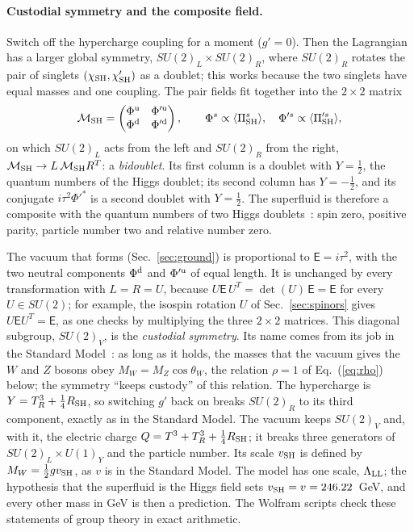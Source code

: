 \documentclass[aps,prd,twocolumn,superscriptaddress,nofootinbib,floatfix,longbibliography]{revtex4-2}
\newcommand{\LL}{{\rm LL}}
\newcommand{\SH}{{\rm SH}}
\begin{document}
\paragraph*{Custodial symmetry and the composite field.}
Switch off the hypercharge coupling for a moment ($g'=0$). Then the Lagrangian has a larger global symmetry,
$SU(2)_L\times SU(2)_R$, where $SU(2)_R$ rotates the pair of singlets $(\chi_\SH,\chi'_\SH)$ as a doublet; this works
because the two singlets have equal masses and one coupling. The pair fields fit together into the $2\times2$ matrix
\begin{equation}
\mathcal M_\SH=\begin{pmatrix}\Phi^{\rm u}&\Phi'^{\rm u}\\\Phi^{\rm d}&\Phi'^{\rm d}\end{pmatrix},\qquad
\Phi^s\propto\langle\Pi^s_\SH\rangle,\quad\Phi'^s\propto\langle\Pi'^s_\SH\rangle ,
\label{eq:M}
\end{equation}
on which $SU(2)_L$ acts from the left and $SU(2)_R$ from the right, $\mathcal M_\SH\to L\,\mathcal M_\SH R^T$: a
\emph{bidoublet}. Its first column is a doublet with $Y=\frac12$, the quantum numbers of the Higgs doublet; its second
column has $Y=-\frac12$, and its conjugate $i\tau^2\Phi'^*$ is a second doublet with $Y=\frac12$. The superfluid is
therefore a composite with the quantum numbers of two Higgs doublets~\cite{Branco2012}: spin zero, positive parity,
particle number two and relative number zero.

The vacuum that forms (Sec.~\ref{sec:ground}) is proportional to $\mathsf E=i\tau^2$, with the two neutral components
$\Phi^{\rm d}$ and $\Phi'^{\rm u}$ of equal length. It is unchanged by every transformation with $L=R=U$, because
$U\mathsf E\,U^T=\det(U)\,\mathsf E=\mathsf E$ for every $U\in SU(2)$; for example, the isospin rotation $U$ of
Sec.~\ref{sec:spinors} gives $U\mathsf EU^T=\mathsf E$, as one checks by multiplying the three $2\times2$ matrices. This
diagonal subgroup, $SU(2)_V$, is the \emph{custodial symmetry}. Its name comes from its job in the Standard
Model~\cite{SSVZ1980}: as long as it holds, the masses that the vacuum gives the $W$ and $Z$ bosons obey $M_W=M_Z\cos\theta_W$,
the relation $\rho=1$ of Eq.~(\ref{eq:rho}) below; the symmetry ``keeps custody'' of this relation. The hypercharge is
$Y=T^3_R+\frac14R_\SH$, so switching $g'$ back on breaks $SU(2)_R$ to its third component, exactly as in the Standard
Model. The vacuum keeps $SU(2)_V$ and, with it, the electric charge $Q=T^3+T^3_R+\frac14R_\SH$; it breaks three
generators of $SU(2)_L\times U(1)_Y$ and the particle number. Its scale $v_\SH$ is defined by $M_W=\frac12gv_\SH$, as $v$
is in the Standard Model. The model has one scale, $\Lambda_\LL$; the hypothesis that the superfluid is the Higgs field
sets $v_\SH=v=246.22$~GeV, and every other mass in GeV is then a prediction. The Wolfram scripts check these statements
of group theory in exact arithmetic.
\end{document}
